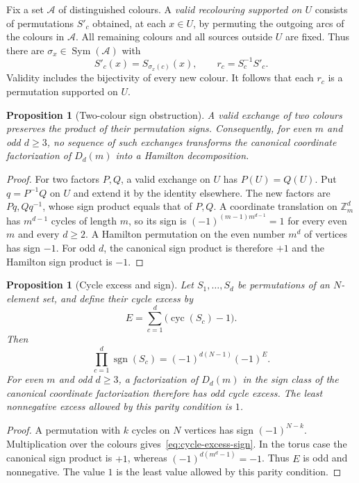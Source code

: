 \documentclass[11pt,reqno]{amsart}
\numberwithin{equation}{section}
\newtheorem{proposition}[theorem]{Proposition}
\theoremstyle{definition}
\theoremstyle{remark}
\newcommand{\Zm}{\mathbb Z_m}
\newcommand{\cyc}{\operatorname{cyc}}
\newcommand{\sgn}{\operatorname{sgn}}
\newcommand{\Sym}{\operatorname{Sym}}
\newcommand{\cA}{\mathcal A}
\begin{document}
Fix a set $\cA$ of distinguished colours. A \emph{valid recolouring supported on $U$}
consists of permutations $S'_c$ obtained, at each $x\in U$, by permuting the
outgoing arcs of the colours in $\cA$. All remaining colours and all sources
outside $U$ are fixed. Thus there are $\sigma_x\in\Sym(\cA)$ with
\begin{equation}\label{eq:recolour}
 S'_c(x)=S_{\sigma_x(c)}(x),\qquad r_c=S_c^{-1}S'_c.
\end{equation}
Validity includes the bijectivity of every new colour. It follows that each
$r_c$ is a permutation supported on $U$.

\begin{proposition}[Two-colour sign obstruction]\label{prop:sign}
A valid exchange of two colours preserves the product of their permutation
signs. Consequently, for even $m$ and odd $d\ge3$, no sequence of such exchanges
transforms the canonical coordinate factorization of $D_d(m)$ into a Hamilton
decomposition.
\end{proposition}
\begin{proof}
For two factors $P,Q$, a valid exchange on $U$ has $P(U)=Q(U)$. Put
$q=P^{-1}Q$ on $U$ and extend it by the identity elsewhere. The new factors are
$Pq,Qq^{-1}$, whose sign product equals that of $P,Q$.
A coordinate translation on $\Zm^d$ has $m^{d-1}$ cycles of length $m$, so its
sign is $(-1)^{(m-1)m^{d-1}}=1$ for every even $m$ and every $d\ge2$.
A Hamilton permutation on the even number $m^d$ of vertices has sign $-1$.
For odd $d$, the canonical sign product is therefore $+1$ and the Hamilton
sign product is $-1$.
\end{proof}

\begin{proposition}[Cycle excess and sign]\label{prop:cycle-excess}
Let $S_1,\ldots,S_d$ be permutations of an $N$-element set, and define their
\emph{cycle excess} by
\[
 E=\sum_{c=1}^d\bigl(\cyc(S_c)-1\bigr).
\]
Then
\begin{equation}\label{eq:cycle-excess-sign}
 \prod_{c=1}^d\sgn(S_c)=(-1)^{d(N-1)}(-1)^E.
\end{equation}
For even $m$ and odd $d\ge3$, a factorization of $D_d(m)$ in the sign class of
the canonical coordinate factorization therefore has odd cycle excess. The
least nonnegative excess allowed by this parity condition is $1$.
\end{proposition}
\begin{proof}
A permutation with $k$ cycles on $N$ vertices has sign $(-1)^{N-k}$.
Multiplication over the colours gives~\eqref{eq:cycle-excess-sign}. In the torus
case the canonical sign product is $+1$, whereas $(-1)^{d(m^d-1)}=-1$.
Thus $E$ is odd and nonnegative. The value $1$ is the least value allowed by
this parity condition.
\end{proof}
\end{document}
